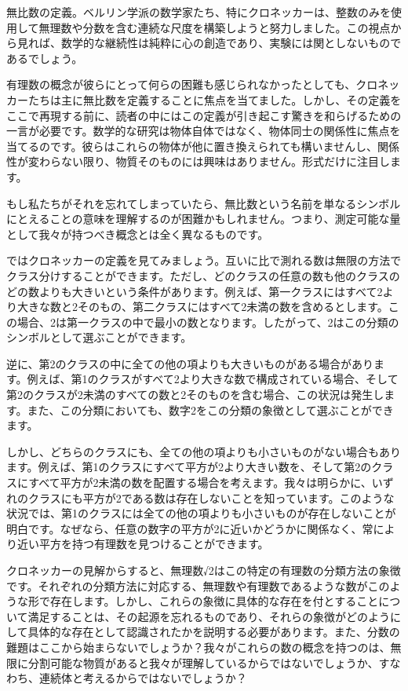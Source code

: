 \documentclass[a4paper,11pt,openany]{ltjsbook}
\begin{document}
無比数の定義。ベルリン学派の数学家たち、特にクロネッカーは、整数のみを使用して無理数や分数を含む連続な尺度を構築しようと努力しました。この視点から見れば、数学的な継続性は純粋に心の創造であり、実験には関としないものであるでしょう。

有理数の概念が彼らにとって何らの困難も感じられなかったとしても、クロネッカーたちは主に無比数を定義することに焦点を当てました。しかし、その定義をここで再現する前に、読者の中にはこの定義が引き起こす驚きを和らげるための一言が必要です。数学的な研究は物体自体ではなく、物体同士の関係性に焦点を当てるのです。彼らはこれらの物体が他に置き換えられても構いませんし、関係性が変わらない限り、物質そのものには興味はありません。形式だけに注目します。

もし私たちがそれを忘れてしまっていたら、無比数という名前を単なるシンボルにとえることの意味を理解するのが困難かもしれません。つまり、測定可能な量として我々が持つべき概念とは全く異なるものです。

ではクロネッカーの定義を見てみましょう。互いに比で測れる数は無限の方法でクラス分けすることができます。ただし、どのクラスの任意の数も他のクラスのどの数よりも大きいという条件があります。例えば、第一クラスにはすべて2より大きな数と2そのもの、第二クラスにはすべて2未満の数を含めるとします。この場合、2は第一クラスの中で最小の数となります。したがって、2はこの分類のシンボルとして選ぶことができます。

逆に、第2のクラスの中に全ての他の項よりも大きいものがある場合があります。例えば、第1のクラスがすべて2より大きな数で構成されている場合、そして第2のクラスが2未満のすべての数と2そのものを含む場合、この状況は発生します。また、この分類においても、数字2をこの分類の象徴として選ぶことができます。

しかし、どちらのクラスにも、全ての他の項よりも小さいものがない場合もあります。例えば、第1のクラスにすべて平方が2より大きい数を、そして第2のクラスにすべて平方が2未満の数を配置する場合を考えます。我々は明らかに、いずれのクラスにも平方が2である数は存在しないことを知っています。このような状況では、第1のクラスには全ての他の項よりも小さいものが存在しないことが明白です。なぜなら、任意の数字の平方が2に近いかどうかに関係なく、常により近い平方を持つ有理数を見つけることができます。

クロネッカーの見解からすると、無理数√2はこの特定の有理数の分類方法の象徴です。それぞれの分類方法に対応する、無理数や有理数であるような数がこのような形で存在します。しかし、これらの象徴に具体的な存在を付とすることについて満足することは、その起源を忘れるものであり、それらの象徴がどのようにして具体的な存在として認識されたかを説明する必要があります。また、分数の難題はここから始まらないでしょうか？我々がこれらの数の概念を持つのは、無限に分割可能な物質があると我々が理解しているからではないでしょうか、すなわち、連続体と考えるからではないでしょうか？
\end{document}
